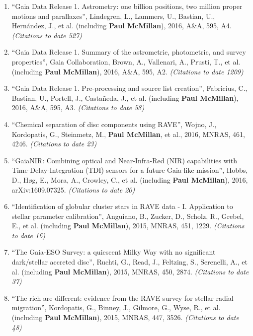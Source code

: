\documentclass{resume}
\begin{document}
\begin{enumerate}
\item ``Gaia Data Release 1. Astrometry: one billion positions, two million proper motions and parallaxes'', Lindegren, L., Lammers, U., Bastian, U., Hern\'andez, J., et al. (including \textbf{Paul McMillan}), 2016, A\&A, 595, A4. \textit{(Citations to date 527)}

\item ``Gaia Data Release 1. Summary of the astrometric, photometric, and survey properties'', Gaia Collaboration, Brown, A., Vallenari, A., Prusti, T., et al. (including \textbf{Paul McMillan}), 2016, A\&A, 595, A2. \textit{(Citations to date 1209)}

\item ``Gaia Data Release 1. Pre-processing and source list creation'', Fabricius, C., Bastian, U., Portell, J., Casta\~neda, J., et al. (including \textbf{Paul McMillan}), 2016, A\&A, 595, A3. \textit{(Citations to date 58)}

\item ``Chemical separation of disc components using RAVE'', Wojno, J., Kordopatis, G., Steinmetz, M., \textbf{Paul McMillan}, et al., 2016, MNRAS, 461, 4246. \textit{(Citations to date 23)}

\item ``GaiaNIR: Combining optical and Near-Infra-Red (NIR) capabilities with Time-Delay-Integration (TDI) sensors for a future Gaia-like mission'', Hobbs, D., H{\o}g, E., Mora, A., Crowley, C., et al. (including \textbf{Paul McMillan}), 2016, arXiv:1609.07325. \textit{(Citations to date 20)}

\item ``Identification of globular cluster stars in RAVE data - I. Application to stellar parameter calibration'', Anguiano, B., Zucker, D., Scholz, R., Grebel, E., et al. (including \textbf{Paul McMillan}), 2015, MNRAS, 451, 1229. \textit{(Citations to date 16)}

\item ``The Gaia-ESO Survey: a quiescent Milky Way with no significant dark/stellar accreted disc'', Ruchti, G., Read, J., Feltzing, S., Serenelli, A., et al. (including \textbf{Paul McMillan}), 2015, MNRAS, 450, 2874. \textit{(Citations to date 37)}

\item ``The rich are different: evidence from the RAVE survey for stellar radial migration'', Kordopatis, G., Binney, J., Gilmore, G., Wyse, R., et al. (including \textbf{Paul McMillan}), 2015, MNRAS, 447, 3526. \textit{(Citations to date 48)}


\end{enumerate}
\end{document}
